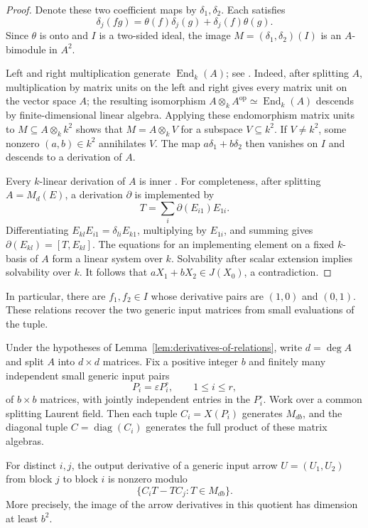 \begin{proof}
Denote these two coefficient maps by $\delta_1,\delta_2$.  Each
satisfies
\[
 \delta_j(fg)=\theta(f)\delta_j(g)+\delta_j(f)\theta(g).
\]
Since $\theta$ is onto and $I$ is a two-sided ideal, the image
$M=(\delta_1,\delta_2)(I)$ is an $A$-bimodule in $A^2$.

Left and right multiplication generate $\operatorname{End}_k(A)$;
see \cite[Chapter~IV, Corollary~2.9]{MilneCFT}.
Indeed, after splitting $A$, multiplication by matrix units on the
left and right gives every matrix unit on the vector space $A$;
the resulting isomorphism
$A\otimes_k A^{\mathrm{op}}\simeq\operatorname{End}_k(A)$ descends
by finite-dimensional linear algebra.  Applying these endomorphism
matrix units to $M\subseteq A\otimes_k k^2$ shows that
$M=A\otimes_k V$ for a subspace $V\subseteq k^2$.
If $V\ne k^2$, some nonzero $(a,b)\in k^2$ annihilates $V$.
The map $a\delta_1+b\delta_2$ then vanishes on $I$ and descends to
a derivation of $A$.

Every $k$-linear derivation of $A$ is inner
\cite[Theorem~8]{Jacobson1937Derivations}. For completeness, after
splitting $A=M_d(E)$, a derivation $\partial$ is implemented by
\[
 T=\sum_i\partial(E_{i1})E_{1i}.
\]
Differentiating $E_{kl}E_{i1}=\delta_{li}E_{k1}$, multiplying by
$E_{1i}$, and summing gives $\partial(E_{kl})=[T,E_{kl}]$.
The equations for an implementing element on a fixed $k$-basis of
$A$ form a linear system over $k$.  Solvability after scalar
extension implies solvability over $k$.
It follows that $aX_1+bX_2\in J(X_0)$, a contradiction.
\end{proof}

In particular, there are $f_1,f_2\in I$ whose derivative pairs are
$(1,0)$ and $(0,1)$.  These relations recover the two generic input
matrices from small evaluations of the tuple.

\begin{lemma}
\label{lem:generic-generating-blocks}
Under the hypotheses of Lemma~\ref{lem:derivatives-of-relations},
write $d=\deg A$ and split $A$ into $d\times d$ matrices.  Fix a
positive integer $b$ and finitely many independent small generic input pairs
\[
 P_i=\varepsilon P_i^{\circ},\qquad 1\le i\le r,
\]
of $b\times b$ matrices, with jointly independent entries in the
$P_i^{\circ}$.  Work over a common splitting Laurent field.
Then each tuple $C_i=X(P_i)$ generates $M_{db}$, and the diagonal
tuple $C=\operatorname{diag}(C_i)$ generates the full product of
these matrix algebras.

For distinct $i,j$, the output derivative of a generic input arrow
$U=(U_1,U_2)$ from block $j$ to block $i$ is nonzero modulo
\[
 \{C_iT-TC_j:T\in M_{db}\}.
\]
More precisely, the image of the arrow derivatives in this quotient
has dimension at least $b^2$.
\end{lemma}

